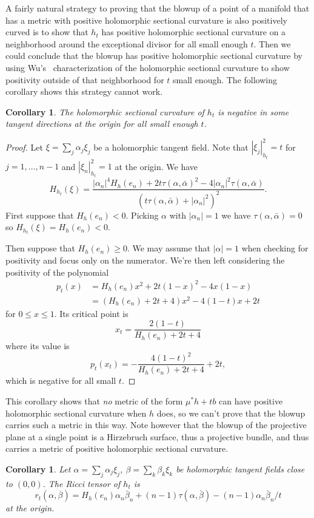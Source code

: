 \documentclass[10pt,a4paper]{amsart}
\newtheorem{coro}[theo]{Corollary}
\def\ton{\alpha}
\def\ttw{\beta}
\def\ov#1{\overline{#1}}
\def\hsc{holomorphic sectional curvature}
\begin{document}
A fairly natural strategy to proving that the blowup of a point of a manifold
that has a metric with positive \hsc{} is also positively curved is to
show that $h_t$ has positive \hsc{} on a neighborhood around the exceptional
divisor for all small enough $t$. Then we could conclude that the blowup has
positive \hsc{} by using Wu's~\cite{wu1973remark} characterization of the
\hsc{} to show positivity outside of that neighborhood for $t$ small enough.
The following corollary shows this strategy cannot work.


\begin{coro}
The holomorphic sectional curvature of $h_t$ is negative in
some tangent directions at the origin for all small enough $t$.
\end{coro}

\begin{proof}
Let $\xi = \sum_j \ton_j \xi_j$ be a holomorphic tangent field.
Note that $|\xi_j|_{h_t}^2 = t$ for $j = 1, \ldots, n-1$ and $|\xi_n|_{h_t}^2 = 1$
at the origin.
We have
$$
H_{h_t}(\xi)
= \frac{|\ton_n|^4 H_h(e_n)
+ 2t \tau(\ton, \bar \ton)^2
- 4 |\ton_n|^2 \tau(\ton, \bar \ton)}{(t \tau(\ton, \bar \ton) + |\ton_n|^2)^2}.
$$
First suppose that $H_h(e_n) < 0$. Picking $\ton$ with $|\ton_n| = 1$ we have
$\tau(\ton, \bar \ton) = 0$ so $H_{h_t}(\xi) = H_h(e_n) < 0$.

Then suppose that $H_h(e_n) \geq 0$.
We may assume that $|\ton| = 1$ when checking for positivity and focus only on
the numerator. We're then left considering the positivity of the polynomial
\begin{align*}
p_t(x)
&= H_h(e_n) x^2 + 2t(1-x)^2 - 4x(1-x)
\\
&= (H_h(e_n) + 2t + 4) x^2 - 4(1 - t) x + 2t
\end{align*}
for $0 \leq x \leq 1$.
Its critical point is
$$
x_t = \frac{2(1-t)}{H_h(e_n) + 2t + 4}
$$
where its value is
$$
p_t(x_t) = -\frac{4(1-t)^2}{H_h(e_n) + 2t + 4} + 2t,
$$
which is negative for all small $t$.
\end{proof}


This corollary shows that \emph{no} metric of the form $\mu^* h + tb$ can have
positive \hsc{} when $h$ does, so we can't prove that the blowup carries such
a metric in this way.
Note however that the blowup of the projective plane at a single point
is a Hirzebruch surface, thus a projective bundle, and thus carries
a metric of positive \hsc{}.




\begin{coro}
Let
$\alpha = \sum_j \ton_j \xi_j$,
$\beta = \sum_k \ttw_k \xi_k$
be holomorphic tangent fields close to $(0,0)$.
The Ricci tensor of $h_t$ is
$$
r_t(\alpha, \ov\beta)
= H_h(e_n) \ton_n \bar \ttw_n
+ (n-1) \tau(\ton, \bar \ttw)
- (n-1) \ton_n \bar \ttw_n / t
$$
at the origin.
\end{coro}
\end{document}
